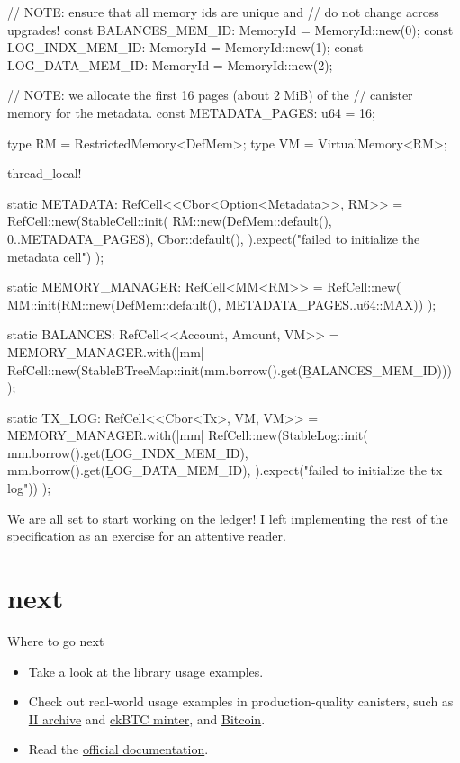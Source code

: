 \documentclass{article}
\begin{document}
\begin{code}[rust]
// NOTE: ensure that all memory ids are unique and
// do not change across upgrades!
const BALANCES_MEM_ID: MemoryId = MemoryId::new(0);
const LOG_INDX_MEM_ID: MemoryId = MemoryId::new(1);
const LOG_DATA_MEM_ID: MemoryId = MemoryId::new(2);

// NOTE: we allocate the first 16 pages (about 2 MiB) of the
// canister memory for the metadata.
const METADATA_PAGES: u64 = 16;

type RM = RestrictedMemory<DefMem>;
type VM = VirtualMemory<RM>;

thread_local! {
  static METADATA: RefCell<\href{#stable-cell}{}<Cbor<Option<Metadata>>, RM>> =
    RefCell::new(StableCell::init(
        RM::new(DefMem::default(), 0..METADATA_PAGES),
        Cbor::default(),
      ).expect("failed to initialize the metadata cell")
    );

  static MEMORY_MANAGER: RefCell<MM<RM>> = RefCell::new(
    MM::init(RM::new(DefMem::default(), METADATA_PAGES..u64::MAX))
  );

  static BALANCES: RefCell<\href{#stable-btree}{}<Account, Amount, VM>> =
    MEMORY_MANAGER.with(|mm| {
      RefCell::new(StableBTreeMap::init(mm.borrow().get(\b{BALANCES_MEM_ID})))
    });

  static TX_LOG: RefCell<\href{#stable-log}{}<Cbor<Tx>, VM, VM>> =
    MEMORY_MANAGER.with(|mm| {
      RefCell::new(StableLog::init(
        mm.borrow().get(\b{LOG_INDX_MEM_ID}),
        mm.borrow().get(\b{LOG_DATA_MEM_ID}),
      ).expect("failed to initialize the tx log"))
    });
}
\end{code}

We are all set to start working on the ledger!
I left implementing the rest of the specification as an exercise for an attentive reader.

\section{next}{Where to go next}
\begin{itemize}
  \item Take a look at the library \href{https://github.com/dfinity/stable-structures/tree/main/examples/src}{usage examples}.
  \item Check out real-world usage examples in production-quality canisters, such as \href{https://github.com/dfinity/internet-identity/blob/97e8d968aba653c8857537ecd541b35de5085608/src/archive/src/main.rs}{II archive} and \href{https://github.com/dfinity/ic/blob/df57b720fd0ceed70f021f4812c797fb40d97503/rs/bitcoin/ckbtc/minter/src/storage.rs}{ckBTC minter}, and \href{https://github.com/dfinity/bitcoin-canister/blob/9242d5f9a784ac115c2042fd09705dd9321ff7b7/canister/src/block_header_store.rs#L13}{Bitcoin}.
  \item Read the \href{https://docs.rs/ic-stable-structures/latest/ic_stable_structures/}{official documentation}.
\end{itemize}
\end{document}
